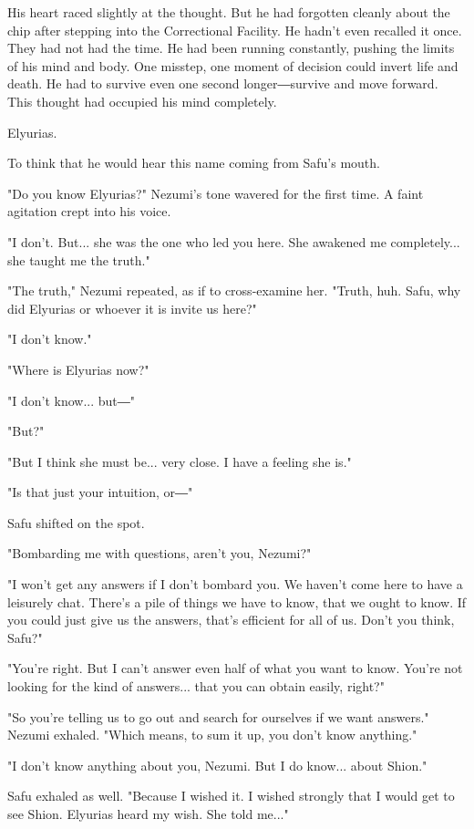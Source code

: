 His heart raced slightly at the thought. But he had forgotten cleanly
about the chip after stepping into the Correctional Facility. He hadn't
even recalled it once. They had not had the time. He had been running
constantly, pushing the limits of his mind and body. One misstep, one
moment of decision could invert life and death. He had to survive even
one second longer―survive and move forward. This thought had occupied
his mind completely.

Elyurias.

To think that he would hear this name coming from Safu's mouth.

"Do you know Elyurias?" Nezumi's tone wavered for the first time. A
faint agitation crept into his voice.

"I don't. But... she was the one who led you here. She awakened me
completely... she taught me the truth."

"The truth," Nezumi repeated, as if to cross-examine her. "Truth, huh.
Safu, why did Elyurias or whoever it is invite us here?"

"I don't know."

"Where is Elyurias now?"

"I don't know... but―"

"But?"

"But I think she must be... very close. I have a feeling she is."

"Is that just your intuition, or―"

Safu shifted on the spot.

"Bombarding me with questions, aren't you, Nezumi?"

"I won't get any answers if I don't bombard you. We haven't come here to
have a leisurely chat. There's a pile of things we have to know, that we
ought to know. If you could just give us the answers, that's efficient
for all of us. Don't you think, Safu?"

"You're right. But I can't answer even half of what you want to know.
You're not looking for the kind of answers... that you can obtain
easily, right?"

"So you're telling us to go out and search for ourselves if we want
answers." Nezumi exhaled. "Which means, to sum it up, you don't know
anything."

"I don't know anything about you, Nezumi. But I do know... about Shion."

Safu exhaled as well. "Because I wished it. I wished strongly that I
would get to see Shion. Elyurias heard my wish. She told me..."

